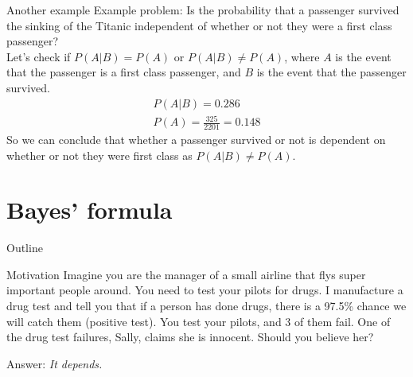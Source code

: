 \documentclass[xcolor=dvipsnames]{beamer}
\begin{document}
\begin{frame}{Another example}
	Example problem: Is the probability that a passenger survived the sinking of the Titanic independent of whether or not they were a first class passenger? \\ \pause
	Let's check if $P(A|B) = P(A)$ or $P(A|B) \neq P(A)$, where $A$ is the event that the passenger is a first class passenger, and $B$ is the event that the passenger survived. \pause
	\begin{gather*}
		P(A|B) = 0.286 \\
		P(A) = \frac{325}{2201} = 0.148
	\end{gather*} \pause
	So we can conclude that whether a passenger survived or not is dependent on whether or not they were first class as $P(A|B) \neq P(A)$.
\end{frame}

\section{Bayes' formula}
\begin{frame}{Outline}
\tableofcontents[currentsection,subsectionstyle=show/shaded/hide]
\end{frame}

\begin{frame}{Motivation}
Imagine you are the manager of a small airline that flys super important people around. You need to test your pilots for drugs. I manufacture a drug test and tell you that if a person has done drugs, there is a 97.5\% chance we will catch them (positive test). You test your pilots, and 3 of them fail. One of the drug test failures, Sally, claims she is innocent. Should you believe her? \pause

\vspace{10pt}
Answer: \emph{It depends.}

\end{frame}
\end{document}
